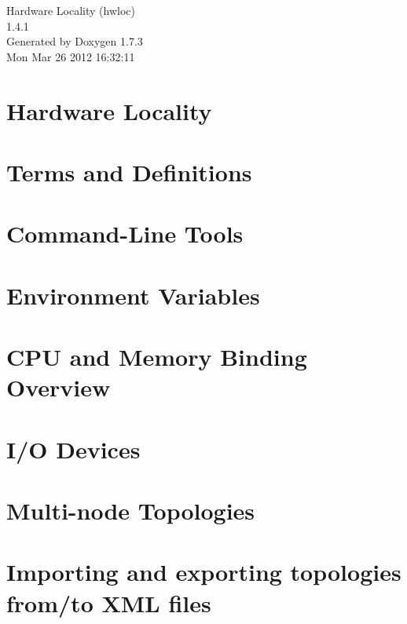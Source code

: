 \documentclass[letterpaper]{book}
\begin{document}
\hypersetup{pageanchor=false}
\begin{titlepage}
\vspace*{7cm}
\begin{center}
{\Large Hardware Locality (hwloc) \\[1ex]\large 1.4.1 }\\
\vspace*{1cm}
{\large Generated by Doxygen 1.7.3}\\
\vspace*{0.5cm}
{\small Mon Mar 26 2012 16:32:11}\\
\end{center}
\end{titlepage}
\clearemptydoublepage
{}
\tableofcontents
\clearemptydoublepage
{}
\hypersetup{pageanchor=true}
\chapter{Hardware Locality}
\label{index}\hypertarget{index}{}
\chapter{Terms and Definitions}
\label{termsanddefs}
\hypertarget{termsanddefs}{}

\chapter{Command-\/Line Tools}
\label{tools}
\hypertarget{tools}{}

\chapter{Environment Variables}
\label{envvar}
\hypertarget{envvar}{}

\chapter{CPU and Memory Binding Overview}
\label{cpu_mem_bind}
\hypertarget{cpu_mem_bind}{}

\chapter{I/O Devices}
\label{iodevices}
\hypertarget{iodevices}{}

\chapter{Multi-\/node Topologies}
\label{multinode}
\hypertarget{multinode}{}

\chapter{Importing and exporting topologies from/to XML files}
\label{xml}
\hypertarget{xml}{}

\end{document}
